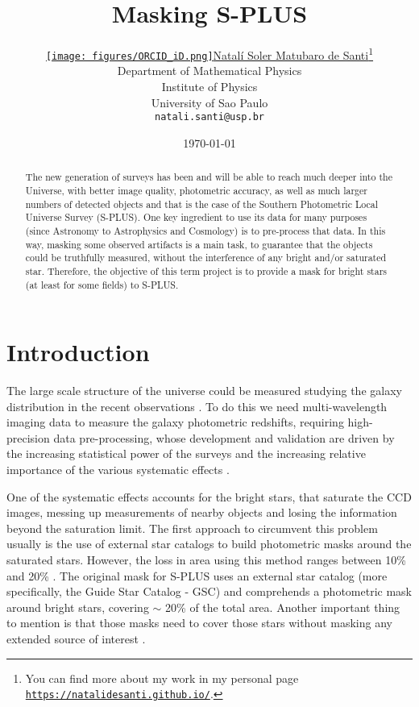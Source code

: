 \documentclass{article}
\title{\bf Masking S-PLUS}
\date{\today}	%
\author{ \href{ https://orcid.org/0000-0002-4728-6881}{\texttt{[image: figures/ORCID\_iD.png]}\hspace{1mm}Natalí Soler Matubaro de Santi}\thanks{You can find more about my work in my personal page \href{https://natalidesanti.github.io/}{\texttt{https://natalidesanti.github.io/}}.} \\
	Department of Mathematical Physics\\
        Institute of Physics\\
	University of Sao Paulo\\
	\texttt{natali.santi@usp.br} \\
}
\begin{document}
\maketitle

\begin{abstract}
  The new generation of surveys has been and will be able to reach much deeper into the Universe, with better image quality, photometric accuracy, as well as much larger numbers of detected objects and that is the case of the Southern Photometric Local Universe Survey (S-PLUS). One key ingredient to use its data for many purposes (since Astronomy to Astrophysics and Cosmology) is to pre-process that data. In this way, masking some observed artifacts is a main task, to guarantee that the objects could be truthfully measured, without the interference of any bright and/or saturated star. Therefore, the objective of this term project is to provide a mask for bright stars (at least for some fields) to S-PLUS.
\end{abstract}



\section{Introduction}

The large scale structure of the universe could be measured studying the galaxy distribution in the recent observations \cite{DES2005, LSST2008, Euclid2012, PFS2012, DESI2016, SPLUS2019}. To do this we need multi-wavelength imaging data to measure the galaxy photometric redshifts, requiring high-precision data pre-processing, whose development and validation are driven by the increasing statistical power of the surveys and the increasing relative importance of the various systematic effects \cite{Coupon2017}.

One of the systematic effects accounts for the bright stars, that saturate the CCD images, messing up measurements of nearby objects and losing the information beyond the saturation limit. The first approach to circumvent this problem usually is the use of external star catalogs to build photometric masks around the saturated stars. However, the loss in area using this method ranges between 10\% and 20\% \cite{Coupon2009, Heymans2012}. The original mask for S-PLUS uses an external star catalog (more specifically, the Guide Star Catalog - GSC) and comprehends a photometric mask around bright stars, covering $\sim$ 20\% of the total area. Another important thing to mention is that those masks need to cover those stars without masking any extended source of interest \cite{Coupon2017}.
\end{document}
